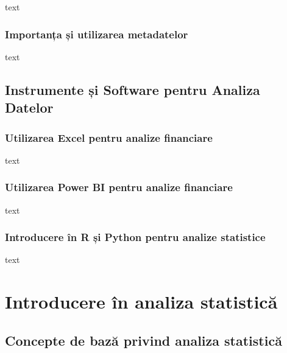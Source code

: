 \documentclass[
  11pt,
  b5paper,
  nottoc]{book}
\begin{document}
text

\hypertarget{importanux21ba-ux219i-utilizarea-metadatelor}{%
\subsection{Importanța și utilizarea
metadatelor}\label{importanux21ba-ux219i-utilizarea-metadatelor}}

text

\hypertarget{instrumente-ux219i-software-pentru-analiza-datelor}{%
\section{Instrumente și Software pentru Analiza
Datelor}\label{instrumente-ux219i-software-pentru-analiza-datelor}}

\hypertarget{utilizarea-excel-pentru-analize-financiare}{%
\subsection{Utilizarea Excel pentru analize
financiare}\label{utilizarea-excel-pentru-analize-financiare}}

text

\hypertarget{utilizarea-power-bi-pentru-analize-financiare}{%
\subsection{Utilizarea Power BI pentru analize
financiare}\label{utilizarea-power-bi-pentru-analize-financiare}}

text

\hypertarget{introducere-uxeen-r-ux219i-python-pentru-analize-statistice}{%
\subsection{Introducere în R și Python pentru analize
statistice}\label{introducere-uxeen-r-ux219i-python-pentru-analize-statistice}}

text


\hypertarget{cap2}{%
\chapter{Introducere în analiza statistică}\label{cap2}}

\hypertarget{concepte-de-bazux103-privind-analiza-statisticux103}{%
\section{Concepte de bază privind analiza
statistică}\label{concepte-de-bazux103-privind-analiza-statisticux103}}
\end{document}
